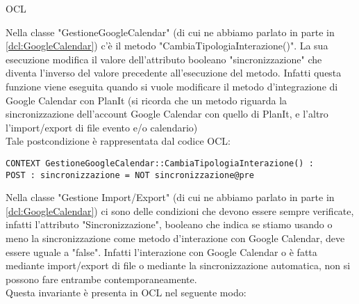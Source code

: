 \begin{listaPersonale}{OCL}
    \begin{center}
        
    \end{center}
    Nella classe "GestioneGoogleCalendar" (di cui ne abbiamo parlato in parte in \ref{dcl:GoogleCalendar}) c'è il metodo "CambiaTipologiaInterazione()". La sua esecuzione modifica il valore dell'attributo booleano "sincronizzazione" che diventa l'inverso del valore precedente all'esecuzione del metodo. Infatti questa funzione viene eseguita quando si vuole modificare il metodo d'integrazione di Google Calendar con PlanIt (si ricorda che un metodo riguarda la sincronizzazione dell'account Google Calendar con quello di PlanIt, e l'altro l'import/export di file evento e/o calendario)\\
    Tale postcondizione è rappresentata dal codice OCL:
    \begin{lstlisting}
CONTEXT GestioneGoogleCalendar::CambiaTipologiaInterazione() :
POST : sincronizzazione = NOT sincronizzazione@pre 
    \end{lstlisting}




    \begin{center}
        
    \end{center}
    Nella classe "Gestione Import/Export" (di cui ne abbiamo parlato in parte in \ref{dcl:GoogleCalendar}) ci sono delle condizioni che devono essere sempre verificate, infatti l'attributo "Sincronizzazione", booleano che indica se stiamo usando  o meno la sincronizzazione come metodo d'interazione con Google Calendar, deve essere uguale a "false". Infatti l'interazione con Google Calendar o è fatta mediante import/export di file o mediante la sincronizzazione automatica, non si possono fare entrambe contemporaneamente.\\
    Questa invariante è presenta in OCL nel seguente modo:


\end{listaPersonale}
